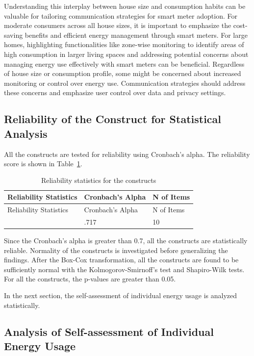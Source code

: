 \documentclass[
  letterpaper,
  DIV=11,
  numbers=noendperiod]{scrartcl}
\begin{document}
Understanding this interplay between house size and consumption habits
can be valuable for tailoring communication strategies for smart meter
adoption. For moderate consumers across all house sizes, it is important
to emphasize the cost-saving benefits and efficient energy management
through smart meters. For large homes, highlighting functionalities like
zone-wise monitoring to identify areas of high consumption in larger
living spaces and addressing potential concerns about managing energy
use effectively with smart meters can be beneficial. Regardless of house
size or consumption profile, some might be concerned about increased
monitoring or control over energy use. Communication strategies should
address these concerns and emphasize user control over data and privacy
settings.

\subsection{Reliability of the Construct for Statistical
Analysis}\label{reliability-of-the-construct-for-statistical-analysis}

All the constructs are tested for reliability using Cronbach's alpha.
The reliability score is shown in
Table~\ref{tbl-reliability-statistics}.

\begin{longtable}[]{@{}lll@{}}
\caption{Reliability statistics for the
constructs}\label{tbl-reliability-statistics}\tabularnewline
\toprule\noalign{}
Reliability Statistics & Cronbach's Alpha & N of Items \\
\midrule\noalign{}
\endfirsthead
\toprule\noalign{}
Reliability Statistics & Cronbach's Alpha & N of Items \\
\midrule\noalign{}
\endhead
\bottomrule\noalign{}
\endlastfoot
& .717 & 10 \\
\end{longtable}

Since the Cronbach's alpha is greater than 0.7, all the constructs are
statistically reliable. Normality of the constructs is investigated
before generalizing the findings. After the Box-Cox transformation, all
the constructs are found to be sufficiently normal with the
Kolmogorov-Smirnoff's test and Shapiro-Wilk tests. For all the
constructs, the p-values are greater than 0.05.

In the next section, the self-assessment of individual energy usage is
analyzed statistically.

\subsection{Analysis of Self-assessment of Individual Energy
Usage}\label{analysis-of-self-assessment-of-individual-energy-usage}
\end{document}
